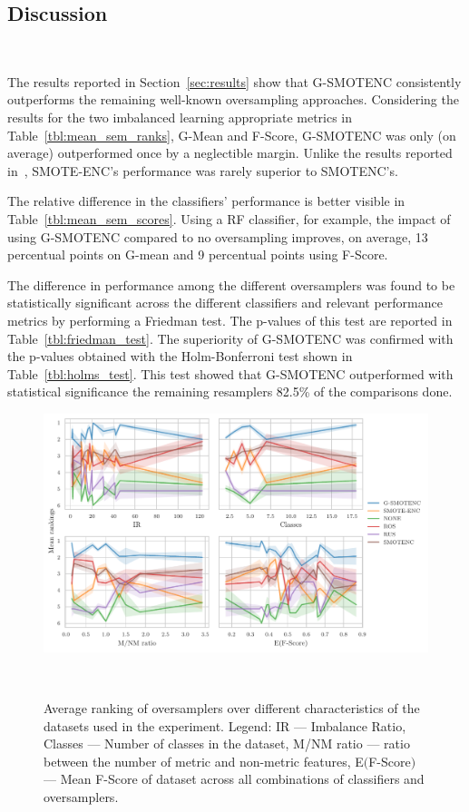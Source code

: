 \documentclass[parskip=full]{scrartcl}
\begin{document}


\subsection{Discussion}~\label{sec:discussion}

The results reported in Section~\ref{sec:results} show that G-SMOTENC
consistently outperforms the remaining well-known oversampling approaches.
Considering the results for the two imbalanced learning appropriate metrics in
Table~\ref{tbl:mean_sem_ranks}, G-Mean and F-Score, G-SMOTENC was only (on
average) outperformed once by a neglectible margin. Unlike the results
reported in~\cite{mukherjee2021smote}, SMOTE-ENC's performance was rarely
superior to SMOTENC's.

The relative difference in the classifiers' performance is better visible in
Table~\ref{tbl:mean_sem_scores}. Using a RF classifier, for example, the
impact of using G-SMOTENC compared to no oversampling improves, on
average, 13 percentual points on G-mean and 9 percentual points
using F-Score. 

The difference in performance among the different oversamplers was found to be
statistically significant across the different classifiers and relevant
performance metrics by performing a Friedman test. The p-values of this test
are reported in Table~\ref{tbl:friedman_test}. The superiority of G-SMOTENC
was confirmed with the p-values obtained with the Holm-Bonferroni test shown
in Table~\ref{tbl:holms_test}. This test showed that G-SMOTENC outperformed
with statistical significance the remaining resamplers 82.5\% of the
comparisons done.

\begin{figure}[H]
	\centering
	\includegraphics[width=\linewidth]{../analysis/consistency_analysis_plot}
    \caption{Average ranking of oversamplers over different characteristics of
        the datasets used in the experiment. Legend: IR --- Imbalance Ratio,
        Classes --- Number of classes in the dataset, M/NM ratio --- ratio
        between the number of metric and non-metric features, E$($F-Score$)$
        --- Mean F-Score of dataset across all combinations of classifiers and
        oversamplers.
    }~\label{fig:consistency_analysis}
\end{figure}
\end{document}
